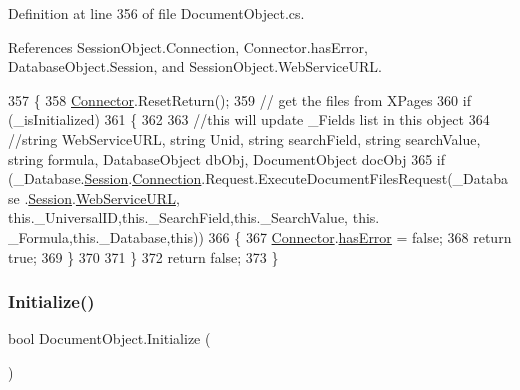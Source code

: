 Definition at line 356 of file Document\+Object.\+cs.



References Session\+Object.\+Connection, Connector.\+has\+Error, Database\+Object.\+Session, and Session\+Object.\+Web\+Service\+U\+RL.


\begin{DoxyCode}
357     \{
358         \mbox{\hyperlink{class_connector}{Connector}}.ResetReturn();
359         \textcolor{comment}{// get the files from XPages}
360         \textcolor{keywordflow}{if} (\_isInitialized)
361         \{
362 
363             \textcolor{comment}{//this will update \_Fields list in this object}
364             \textcolor{comment}{//string WebServiceURL, string Unid, string searchField, string searchValue, string formula,
       DatabaseObject dbObj, DocumentObject docObj}
365             \textcolor{keywordflow}{if} (\_Database.\mbox{\hyperlink{class_database_object_aa8484162b7d2a7c4c9426bca13c64c07}{Session}}.\mbox{\hyperlink{class_session_object_a014bdbf705a753540e19bfb53030c55c}{Connection}}.Request.ExecuteDocumentFilesRequest(\_Database
      .\mbox{\hyperlink{class_database_object_aa8484162b7d2a7c4c9426bca13c64c07}{Session}}.\mbox{\hyperlink{class_session_object_a697c071c812fbf7ad1166b896fb44c16}{WebServiceURL}}, \textcolor{keyword}{this}.\_UniversalID,\textcolor{keyword}{this}.\_SearchField,\textcolor{keyword}{this}.\_SearchValue, \textcolor{keyword}{this}.
      \_Formula,\textcolor{keyword}{this}.\_Database,\textcolor{keyword}{this}))
366             \{
367                 \mbox{\hyperlink{class_connector}{Connector}}.\mbox{\hyperlink{class_connector_a079bae21a5417efa53bfe8954c0f533f}{hasError}} = \textcolor{keyword}{false};
368                 \textcolor{keywordflow}{return} \textcolor{keyword}{true};
369             \}
370 
371         \}
372         \textcolor{keywordflow}{return} \textcolor{keyword}{false};
373     \}
\end{DoxyCode}
\mbox{\label{class_document_object_af4298d6cfbb9ea60643d9995309b73f1}} 
\subsubsection{\texorpdfstring{Initialize()}{Initialize()}}
{\footnotesize\ttfamily bool Document\+Object.\+Initialize (\begin{DoxyParamCaption}{ }\end{DoxyParamCaption})}



